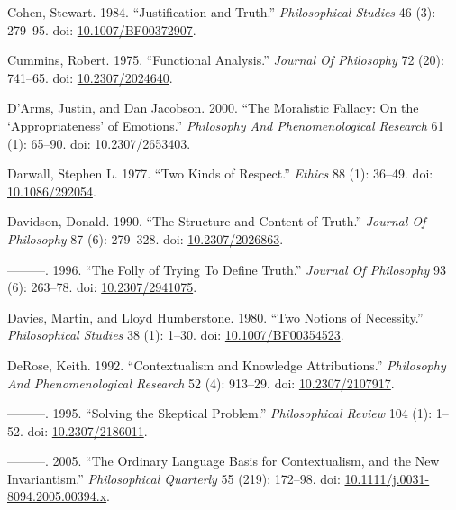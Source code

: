 \documentclass[
  10pt,
  letterpaper,
  DIV=11,
  numbers=noendperiod,
  twoside]{scrartcl}
\newlength{\cslhangindent}
\newenvironment{CSLReferences}[2] %
 {\begin{list}{}{%
  \setlength{\itemindent}{0pt}
  \setlength{\leftmargin}{0pt}
  \setlength{\parsep}{0pt}
  \ifodd #1
   \setlength{\leftmargin}{\cslhangindent}
   \setlength{\itemindent}{-1\cslhangindent}
  \fi
  \setlength{\itemsep}{#2\baselineskip}}}
 {\end{list}}
\begin{document}
\begin{CSLReferences}{1}{0}
Cohen, Stewart. 1984. {``Justification and Truth.''} \emph{Philosophical
Studies} 46 (3): 279--95. doi:
\href{https://doi.org/10.1007/BF00372907}{10.1007/BF00372907}.

Cummins, Robert. 1975. {``Functional Analysis.''} \emph{Journal Of
Philosophy} 72 (20): 741--65. doi:
\href{https://doi.org/10.2307/2024640}{10.2307/2024640}.

D'Arms, Justin, and Dan Jacobson. 2000. {``The Moralistic Fallacy: On
the {`Appropriateness'} of Emotions.''} \emph{Philosophy And
Phenomenological Research} 61 (1): 65--90. doi:
\href{https://doi.org/10.2307/2653403}{10.2307/2653403}.

Darwall, Stephen L. 1977. {``Two Kinds of Respect.''} \emph{Ethics} 88
(1): 36--49. doi: \href{https://doi.org/10.1086/292054}{10.1086/292054}.

Davidson, Donald. 1990. {``The Structure and Content of Truth.''}
\emph{Journal Of Philosophy} 87 (6): 279--328. doi:
\href{https://doi.org/10.2307/2026863}{10.2307/2026863}.

---------. 1996. {``The Folly of Trying To Define Truth.''}
\emph{Journal Of Philosophy} 93 (6): 263--78. doi:
\href{https://doi.org/10.2307/2941075}{10.2307/2941075}.

Davies, Martin, and Lloyd Humberstone. 1980. {``Two Notions of
Necessity.''} \emph{Philosophical Studies} 38 (1): 1--30. doi:
\href{https://doi.org/10.1007/BF00354523}{10.1007/BF00354523}.

DeRose, Keith. 1992. {``Contextualism and Knowledge Attributions.''}
\emph{Philosophy And Phenomenological Research} 52 (4): 913--29. doi:
\href{https://doi.org/10.2307/2107917}{10.2307/2107917}.

---------. 1995. {``Solving the Skeptical Problem.''}
\emph{Philosophical Review} 104 (1): 1--52. doi:
\href{https://doi.org/10.2307/2186011}{10.2307/2186011}.

---------. 2005. {``The Ordinary Language Basis for Contextualism, and
the New Invariantism.''} \emph{Philosophical Quarterly} 55 (219):
172--98. doi:
\href{https://doi.org/10.1111/j.0031-8094.2005.00394.x}{10.1111/j.0031-8094.2005.00394.x}.


\end{CSLReferences}
\end{document}
